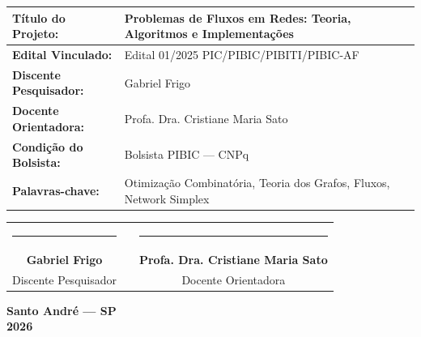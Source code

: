 \begin{center}
\small
{}
\begin{tabular}{|p{}|>{\raggedright\arraybackslash}p{}|}
\hline
\textbf{Título do Projeto:} & Problemas de Fluxos em Redes: Teoria, Algoritmos e Implementações \\ \hline
\textbf{Edital Vinculado:} & Edital 01/2025 PIC/PIBIC/PIBITI/PIBIC-AF \\ \hline
\textbf{Discente Pesquisador:} & Gabriel Frigo \\ \hline
\textbf{Docente Orientadora:} & Profa. Dra. Cristiane Maria Sato \\ \hline
\textbf{Condição do Bolsista:} & Bolsista PIBIC --- CNPq \\ \hline
\textbf{Palavras-chave:} & Otimização Combinatória, Teoria dos Grafos, Fluxos, Network Simplex \\ \hline
\end{tabular}
\end{center}

\vfill

\begin{center}
\small
\begin{tabular}{cp{1.5cm}c}
\rule{6.5cm}{0.4pt} & & \rule{6.5cm}{0.4pt}\\
\textbf{Gabriel Frigo} & & \textbf{Profa. Dra. Cristiane Maria Sato}\\
Discente Pesquisador & & Docente Orientadora
\end{tabular}
\end{center}

\vspace{0.6cm}

\begin{center}
    \textbf{Santo André --- SP}\\
    \textbf{2026}
\end{center}

\newpage
